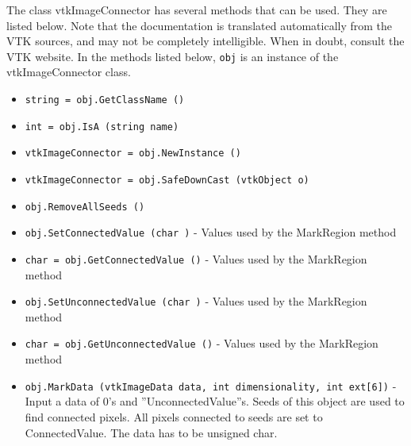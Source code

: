 The class vtkImageConnector has several methods that can be used.
  They are listed below.
Note that the documentation is translated automatically from the VTK sources,
and may not be completely intelligible.  When in doubt, consult the VTK website.
In the methods listed below, \verb|obj| is an instance of the vtkImageConnector class.
\begin{itemize}
\item  \verb|string = obj.GetClassName ()|

\item  \verb|int = obj.IsA (string name)|

\item  \verb|vtkImageConnector = obj.NewInstance ()|

\item  \verb|vtkImageConnector = obj.SafeDownCast (vtkObject o)|

\item  \verb|obj.RemoveAllSeeds ()|

\item  \verb|obj.SetConnectedValue (char )| -  Values used by the MarkRegion method

\item  \verb|char = obj.GetConnectedValue ()| -  Values used by the MarkRegion method

\item  \verb|obj.SetUnconnectedValue (char )| -  Values used by the MarkRegion method

\item  \verb|char = obj.GetUnconnectedValue ()| -  Values used by the MarkRegion method

\item  \verb|obj.MarkData (vtkImageData data, int dimensionality, int ext[6])| -  Input a data of 0's and ''UnconnectedValue''s. Seeds of this object are
 used to find connected pixels.  All pixels connected to seeds are set to
 ConnectedValue.  The data has to be unsigned char.

\end{itemize}
